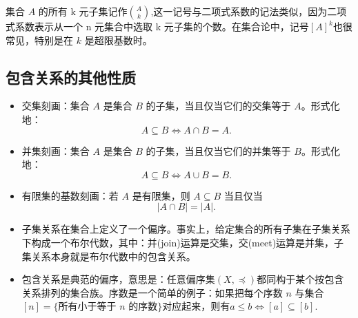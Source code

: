 集合 $A$ 的所有 k 元子集记作$\binom{A}{k}$,这一记号与二项式系数的记法类似，因为二项式系数表示从一个 n 元集合中选取 k 元子集的个数。在集合论中，记号$[A]^k$也很常见，特别是在 $k$ 是超限基数时。
\subsection{包含关系的其他性质}
\begin{itemize}
\item 交集刻画：集合 $A$ 是集合 $B$ 的子集，当且仅当它们的交集等于 $A$。形式化地：
$$
A \subseteq B \iff A \cap B = A.~
$$
\item 并集刻画：集合 $A$ 是集合 $B$ 的子集，当且仅当它们的并集等于 $B$。形式化地：
$$
A \subseteq B \iff A \cup B = B.~
$$
\item 有限集的基数刻画：若 $A$ 是有限集，则 $A \subseteq B$ 当且仅当
$$
|A \cap B| = |A|.~
$$
\item 子集关系在集合上定义了一个偏序。事实上，给定集合的所有子集在子集关系下构成一个布尔代数，其中：并(join)运算是交集，交(meet)运算是并集，子集关系本身就是布尔代数中的包含关系。
\item 包含关系是典范的偏序，意思是：任意偏序集$(X, \preceq)$都同构于某个按包含关系排列的集合族。序数是一个简单的例子：如果把每个序数 $n$ 与集合$[n] = \{ \text{所有小于等于 } n \text{ 的序数} \}$对应起来，则有$a \leq b \iff [a] \subseteq [b]$.
\end{itemize}